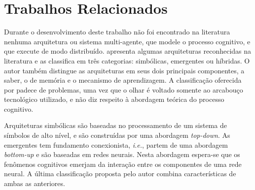 
\chapter{Trabalhos Relacionados}
\label{chap:trabRelac}

\begin{comment}
-- falar da literatura do sistemas cognitivos
    -- blue brain
    
    -- é melhor classificar o  trabalho com base no trabalho na compreensão do processo cognitivo e não na tecnologia
    
    -- lida baseado inteiramente numa teoria simbolista 
    -- buscar uma critica da teoria do workspace global
    
    -- Clarion 
    
-- falar da literatura de sistemas multi-agentes
    -- apresentar cada um deles: por exemplo, modelar propagação de doenças, forrageamento ótimo, 
    no entando o mundo não é regido por um modelo e portanto no mundo real as criaturasnão levam em conta o que é ótimo e nem tem conhecimento de todas as variaveis. Elas vão a cada instante interagindo com o ambiente, e a partir do estado interno, ela seleciona o que fazer e a ação pode ser benefica, ou não.
    
-- relacionar e criticar as duas
\end{comment}

Durante o desenvolvimento deste trabalho não foi encontrado na literatura nenhuma arquitetura ou sistema multi-agente, que modele o processo cognitivo, e que execute de modo distribuído.  apresenta algumas arquiteturas reconhecidas na literatura e as classifica em três categorias: simbólicas, emergentes ou híbridas. O autor também distingue as arquiteturas em  seus dois principais componentes, a saber, o de memória e o mecanismo de aprendizagem. A classificação oferecida por  padece de problemas, uma vez que o olhar é voltado somente ao arcabouço tecnológico utilizado, e não diz respeito à abordagem teórica do processo cognitivo. 

Arquiteturas simbólicas são baseadas no processamento de um sistema de símbolos de alto nível, e são construídas por uma abordagem \textit{top-down}. As emergentes tem fundamento conexionista, \textit{i.e.}, partem de uma abordagem \textit{bottom-up} e são baseadas em redes neurais. Nesta abordagem espera-se que os fenômenos cognitivos emerjam da interação entre os componentes de uma rede neural. A última classificação proposta pelo autor combina características de ambas as anteriores. 

